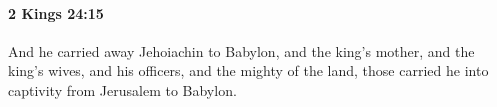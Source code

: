 
		\paragraph{2 Kings 24:15} %
			\label{2KINGS-24-15}

			And he carried away Jehoiachin to Babylon, and the king’s mother, and the king’s wives, and his officers, and the mighty of the land, those carried he into captivity from Jerusalem to Babylon.



